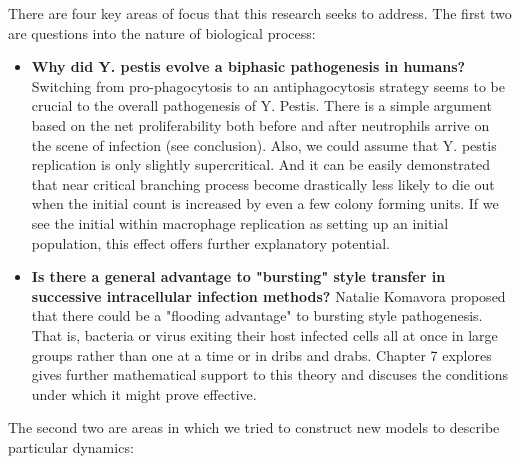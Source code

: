 There are four key areas of focus that this research seeks to address. The first two are questions into the nature of biological process:

\begin{itemize}
\item  \textbf{Why did Y. pestis evolve a biphasic pathogenesis in humans?} 
Switching from pro-phagocytosis to an antiphagocytosis strategy seems to be crucial to the overall pathogenesis of Y. Pestis.  There is a simple argument based on the net proliferability both before and after neutrophils arrive on the scene of infection (see conclusion).  Also,  we could assume that Y. pestis replication is only slightly supercritical.  And it can be easily demonstrated that near critical branching process become drastically less likely to die out when the initial count is increased by even a few colony forming units.  If we see the initial within macrophage replication as setting up an initial population,  this effect offers further explanatory potential. 



\item \textbf{Is there a general advantage to "bursting" style transfer in successive intracellular infection methods?}
Natalie Komavora proposed that there could be a "flooding advantage" to bursting style pathogenesis.  That is,  bacteria or virus exiting their host infected cells all at once in large groups rather than one at a time or in dribs and drabs. Chapter 7 explores gives further mathematical support to this theory and discuses the conditions under which it might prove effective.
\end{itemize} 

\noindent
The second two are areas in which we tried to construct new models to describe particular dynamics:

